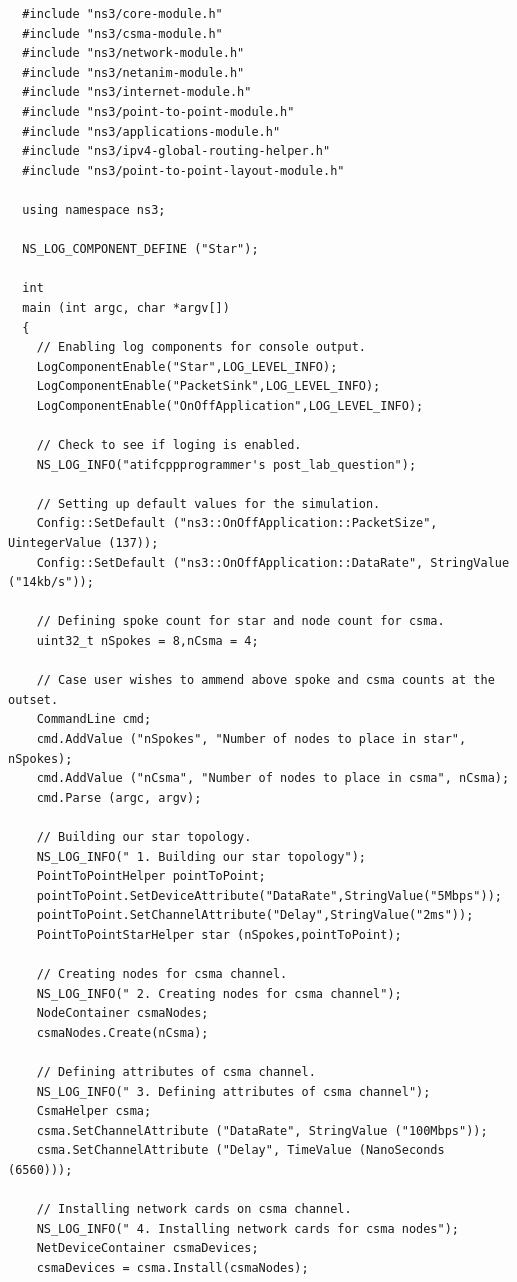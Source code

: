 \documentclass[fullpage]{article}
\begin{document}
\begin{verbatim}
  #include "ns3/core-module.h"
  #include "ns3/csma-module.h"
  #include "ns3/network-module.h"
  #include "ns3/netanim-module.h"
  #include "ns3/internet-module.h"
  #include "ns3/point-to-point-module.h"
  #include "ns3/applications-module.h"
  #include "ns3/ipv4-global-routing-helper.h"
  #include "ns3/point-to-point-layout-module.h"

  using namespace ns3;

  NS_LOG_COMPONENT_DEFINE ("Star");

  int
  main (int argc, char *argv[])
  {
    // Enabling log components for console output.
    LogComponentEnable("Star",LOG_LEVEL_INFO);
    LogComponentEnable("PacketSink",LOG_LEVEL_INFO);
    LogComponentEnable("OnOffApplication",LOG_LEVEL_INFO);

    // Check to see if loging is enabled.
    NS_LOG_INFO("atifcppprogrammer's post_lab_question");

    // Setting up default values for the simulation.
    Config::SetDefault ("ns3::OnOffApplication::PacketSize", UintegerValue (137));
    Config::SetDefault ("ns3::OnOffApplication::DataRate", StringValue ("14kb/s"));

    // Defining spoke count for star and node count for csma.
    uint32_t nSpokes = 8,nCsma = 4;

    // Case user wishes to ammend above spoke and csma counts at the outset.
    CommandLine cmd;
    cmd.AddValue ("nSpokes", "Number of nodes to place in star", nSpokes);
    cmd.AddValue ("nCsma", "Number of nodes to place in csma", nCsma);
    cmd.Parse (argc, argv);

    // Building our star topology.
    NS_LOG_INFO(" 1. Building our star topology");
    PointToPointHelper pointToPoint;
    pointToPoint.SetDeviceAttribute("DataRate",StringValue("5Mbps"));
    pointToPoint.SetChannelAttribute("Delay",StringValue("2ms"));
    PointToPointStarHelper star (nSpokes,pointToPoint);

    // Creating nodes for csma channel.
    NS_LOG_INFO(" 2. Creating nodes for csma channel");
    NodeContainer csmaNodes;
    csmaNodes.Create(nCsma);

    // Defining attributes of csma channel.
    NS_LOG_INFO(" 3. Defining attributes of csma channel");
    CsmaHelper csma;
    csma.SetChannelAttribute ("DataRate", StringValue ("100Mbps"));
    csma.SetChannelAttribute ("Delay", TimeValue (NanoSeconds (6560)));

    // Installing network cards on csma channel.
    NS_LOG_INFO(" 4. Installing network cards for csma nodes");
    NetDeviceContainer csmaDevices;
    csmaDevices = csma.Install(csmaNodes);


\end{verbatim}
\end{document}
